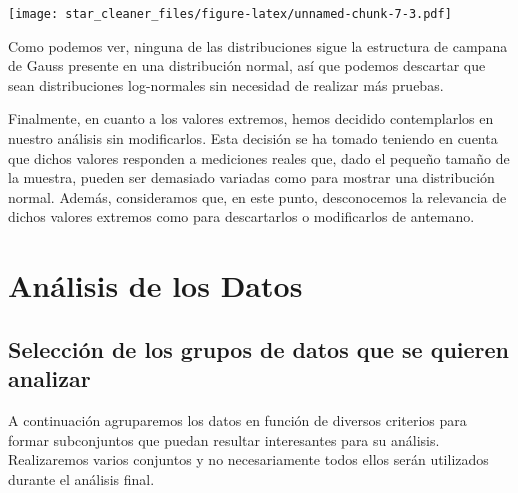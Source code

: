 \documentclass[
]{article}
\begin{document}
\texttt{[image: star\_cleaner\_files/figure-latex/unnamed-chunk-7-3.pdf]}

Como podemos ver, ninguna de las distribuciones sigue la estructura de
campana de Gauss presente en una distribución normal, así que podemos
descartar que sean distribuciones log-normales sin necesidad de realizar
más pruebas.

Finalmente, en cuanto a los valores extremos, hemos decidido
contemplarlos en nuestro análisis sin modificarlos. Esta decisión se ha
tomado teniendo en cuenta que dichos valores responden a mediciones
reales que, dado el pequeño tamaño de la muestra, pueden ser demasiado
variadas como para mostrar una distribución normal. Además, consideramos
que, en este punto, desconocemos la relevancia de dichos valores
extremos como para descartarlos o modificarlos de antemano.

\hypertarget{anuxe1lisis-de-los-datos}{%
\section{Análisis de los Datos}\label{anuxe1lisis-de-los-datos}}

\hypertarget{selecciuxf3n-de-los-grupos-de-datos-que-se-quieren-analizar}{%
\subsection{Selección de los grupos de datos que se quieren
analizar}\label{selecciuxf3n-de-los-grupos-de-datos-que-se-quieren-analizar}}

A continuación agruparemos los datos en función de diversos criterios
para formar subconjuntos que puedan resultar interesantes para su
análisis. Realizaremos varios conjuntos y no necesariamente todos ellos
serán utilizados durante el análisis final.
\end{document}
